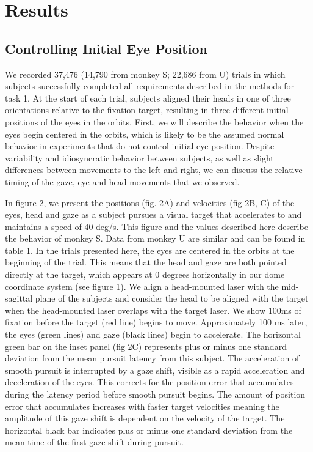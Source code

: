 \documentclass[12pt]{article}
\begin{document}
\section{Results}
\subsection{Controlling Initial Eye Position}
We recorded 37,476 (14,790 from monkey S; 22,686 from U) trials in which subjects successfully completed all requirements described in the methods for task 1. At the start of each trial, subjects aligned their heads in one of three orientations relative to the fixation target, resulting in three different initial positions of the eyes in the orbits. First, we will describe the behavior when the eyes begin centered in the orbits, which is likely to be the assumed normal behavior in experiments that do not control initial eye position. Despite variability and idiosyncratic behavior between subjects, as well as slight differences between movements to the left and right, we can discuss the relative timing of the gaze, eye and head movements that we observed.

In figure 2, we present the positions (fig. 2A) and velocities (fig 2B, C) of the eyes, head and gaze as a subject pursues a visual target that accelerates to and maintains a speed of 40 deg/s. This figure and the values described here describe the behavior of monkey S. Data from monkey U are similar and can be found in table 1. In the trials presented here, the eyes are centered in the orbits at the beginning of the trial. This means that the head and gaze are both pointed directly at the target, which appears at 0 degrees horizontally in our dome coordinate system (see figure 1). We align a head-mounted laser with the mid-sagittal plane of the subjects and consider the head to be aligned with the target when the head-mounted laser overlaps with the target laser. We show 100ms of fixation before the target (red line) begins to move. Approximately 100 ms later, the eyes (green lines) and gaze (black lines) begin to accelerate. The horizontal green bar on the inset panel (fig 2C) represents plus or minus one standard deviation from the mean pursuit latency from this subject. The acceleration of smooth pursuit is interrupted by a gaze shift, visible as a rapid acceleration and deceleration of the eyes. This corrects for the position error that accumulates during the latency period before smooth pursuit begins. The amount of position error that accumulates increases with faster target velocities meaning the amplitude of this gaze shift is dependent on the velocity of the target. The horizontal black bar indicates plus or minus one standard deviation from the mean time of the first gaze shift during pursuit. 
\end{document}
